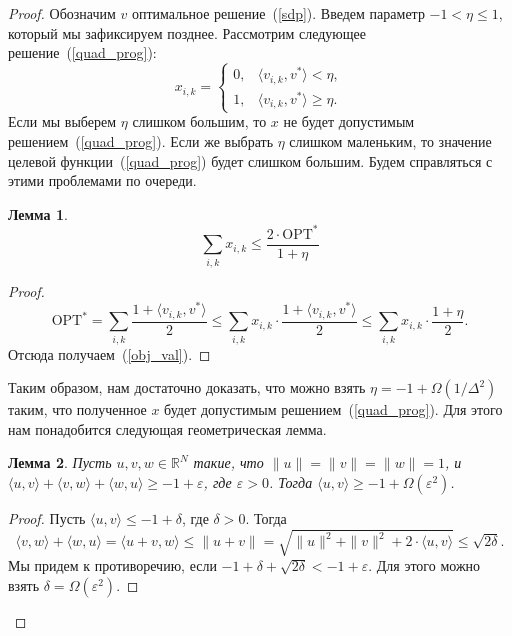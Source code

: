 \documentclass[12pt]{article}
\newcommand{\Rbb}{\mathbb{R}}
\newtheorem{lemma}{Лемма}
\begin{document}
    \begin{proof}
        Обозначим $v$ оптимальное решение~(\ref{sdp}).
        Введем параметр $-1 < \eta \leq 1$, который мы зафиксируем позднее.
        Рассмотрим следующее решение~(\ref{quad_prog}):
        $$
            x_{i,k} = \begin{cases}
                0, & \langle v_{i,k}, v^* \rangle < \eta, \\
                1, & \langle v_{i,k}, v^* \rangle \geq \eta.
            \end{cases}
        $$
        Если мы выберем $\eta$ слишком большим, то $x$ не будет допустимым решением~(\ref{quad_prog}).
        Если же выбрать $\eta$ слишком маленьким, то значение целевой функции~(\ref{quad_prog}) будет слишком большим.
        Будем справляться с этими проблемами по очереди.

        \begin{lemma}
            \begin{equation}
                \label{obj_val}
                \sum_{i,k} x_{i,k} \leq \frac{2 \cdot \mathrm{OPT^*}}{1 + \eta}
            \end{equation}
        \end{lemma}
        \begin{proof}
            $$
                \mathrm{OPT}^* = \sum_{i,k} \frac{1 + \langle v_{i,k}, v^*\rangle}{2} \leq
                \sum_{i,k} x_{i,k} \cdot \frac{1 + \langle v_{i,k}, v^*\rangle}{2} \leq
                \sum_{i,k} x_{i,k} \cdot \frac{1 + \eta}{2}.
            $$
            Отсюда получаем~(\ref{obj_val}).
        \end{proof}

        Таким образом, нам достаточно доказать, что можно взять $\eta = -1 + \Omega(1 / \Delta^2)$ таким, что
        полученное $x$ будет допустимым решением~(\ref{quad_prog}).
        Для этого нам понадобится следующая геометрическая лемма.

        \begin{lemma}
            \label{triangle}
            Пусть $u, v, w \in \Rbb^N$ такие, что $\|u\| = \|v\| = \|w\| = 1$, и
            $\langle u, v \rangle + \langle v, w \rangle + \langle w, u \rangle \geq -1 + \varepsilon$,
            где $\varepsilon > 0$.
            Тогда $\langle u, v \rangle \geq -1 + \Omega(\varepsilon^2)$.
        \end{lemma}
        \begin{proof}
            Пусть $\langle u, v \rangle \leq -1 + \delta$, где $\delta > 0$.
            Тогда
            $$
                \langle v, w \rangle + \langle w, u \rangle = \langle u + v, w \rangle \leq \|u + v\| = 
                \sqrt{\|u\|^2 + \|v\|^2 + 2 \cdot \langle u, v \rangle} \leq \sqrt{2 \delta}.
            $$
            Мы придем к противоречию, если $-1 + \delta + \sqrt{2\delta} < -1 + \varepsilon$.
            Для этого можно взять $\delta = \Omega(\varepsilon^2)$.
        \end{proof}


\end{proof}
\end{document}

